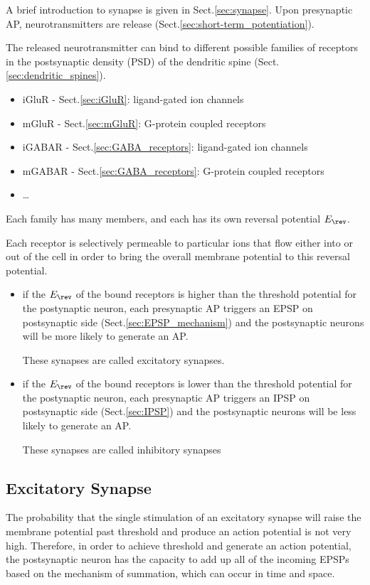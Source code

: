 A brief introduction to synapse is given in Sect.\ref{sec:synapse}.
Upon presynaptic AP, neurotransmitters are release
(Sect.\ref{sec:short-term_potentiation}).

The released neurotransmitter can bind to different possible families of
receptors in the postsynaptic density (PSD) of the dendritic spine
(Sect.\ref{sec:dendritic_spines}).
\begin{itemize}
  \item iGluR - Sect.\ref{sec:iGluR}: ligand-gated ion channels
  \item mGluR - Sect.\ref{sec:mGluR}: G-protein coupled receptors
  \item iGABAR - Sect.\ref{sec:GABA_receptors}: ligand-gated ion channels
  \item mGABAR - Sect.\ref{sec:GABA_receptors}: G-protein coupled receptors
  \item \ldots
\end{itemize}
Each family has many members, and each has its own reversal potential
$E_\rev$.

Each receptor is selectively permeable to particular ions that flow either into
or out of the cell in order to bring the overall membrane potential to this
reversal potential.
\begin{itemize}
  \item if the $E_\rev$ of the bound receptors is higher than the threshold
  potential for the postynaptic neuron, each presynaptic AP triggers an EPSP 
  on postsynaptic side (Sect.\ref{sec:EPSP_mechanism}) and the postsynaptic
  neurons will be more likely to generate an AP.
  
  These synapses are called excitatory synapses.
  
  \item if the $E_\rev$ of the bound receptors is lower than the threshold
  potential for the postynaptic neuron, each presynaptic AP triggers an IPSP
  on postsynaptic side (Sect.\ref{sec:IPSP}) and the postsynaptic neurons will
  be less likely to generate an AP.
  
  These synapses are called inhibitory synapses
\end{itemize}

\subsection{Excitatory Synapse}
\label{sec:excitatory-synapse}

The probability that the single stimulation of an excitatory synapse will raise
the membrane potential past threshold and produce an action potential is not
very high. Therefore, in order to achieve threshold and generate an action
potential, the postsynaptic neuron has the capacity to add up all of the
incoming EPSPs based on the mechanism of summation, which can occur in time and
space.

